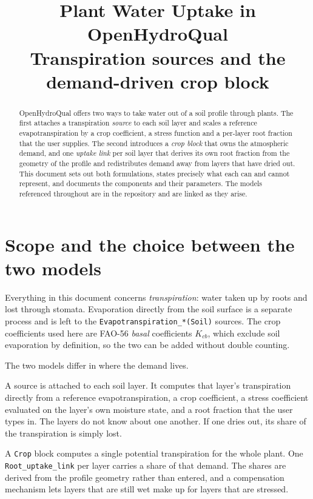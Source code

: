 \documentclass[11pt,a4paper]{article}
\title{\textbf{Plant Water Uptake in OpenHydroQual}\\[0.3em]
       \large Transpiration sources and the demand-driven crop block}
\author{}
\date{}
\newcommand{\code}[1]{\texttt{\small #1}}
\begin{document}
\maketitle
\vspace{-2.5em}

\begin{abstract}
\noindent
OpenHydroQual offers two ways to take water out of a soil profile through
plants. The first attaches a transpiration \emph{source} to each soil layer and
scales a reference evapotranspiration by a crop coefficient, a stress function
and a per-layer root fraction that the user supplies. The second introduces a
\emph{crop block} that owns the atmospheric demand, and one \emph{uptake link}
per soil layer that derives its own root fraction from the geometry of the
profile and redistributes demand away from layers that have dried out. This
document sets out both formulations, states precisely what each can and cannot
represent, and documents the components and their parameters. The models
referenced throughout are in the repository and are linked as they arise.
\end{abstract}

\tableofcontents

\section{Scope and the choice between the two models}

Everything in this document concerns \emph{transpiration}: water taken up by
roots and lost through stomata. Evaporation directly from the soil surface is a
separate process and is left to the \code{Evapotranspiration\_*(Soil)} sources.
The crop coefficients used here are FAO-56 \emph{basal} coefficients $K_{cb}$,
which exclude soil evaporation by definition, so the two can be added without
double counting.

The two models differ in where the demand lives.

\begin{description}[leftmargin=1.4cm,style=nextline]
\item[Model 1, transpiration sources] A source is attached to each soil layer.
  It computes that layer's transpiration directly from a reference
  evapotranspiration, a crop coefficient, a stress coefficient evaluated on the
  layer's own moisture state, and a root fraction that the user types in. The
  layers do not know about one another. If one dries out, its share of the
  transpiration is simply lost.
\item[Model 2, crop block and uptake links] A \code{Crop} block computes a
  single potential transpiration for the whole plant. One
  \code{Root\_uptake\_link} per layer carries a share of that demand. The shares
  are derived from the profile geometry rather than entered, and a compensation
  mechanism lets layers that are still wet make up for layers that are stressed.
\end{description}
\end{document}
